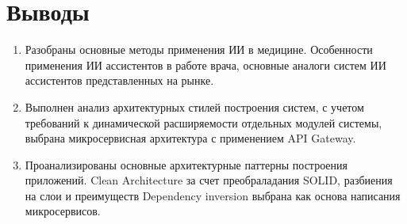 












\section{Выводы}

\begin{enumerate}
    \item Разобраны основные методы применения ИИ в медицине. Особенности применения ИИ ассистентов в работе врача, основные аналоги систем ИИ ассистентов представленных на рынке.
	\item Выполнен анализ архитектурных стилей построения систем, с учетом требований к динамической расширяемости отдельных модулей системы, выбрана микросервисная архитектура с применением API Gateway.
	\item Проанализированы основные архитектурные паттерны построения приложений. Clean Architecture за счет преобраладания SOLID, разбиения на слои и преимуществ Dependency inversion выбрана как основа написания микросервисов.
\end{enumerate}

